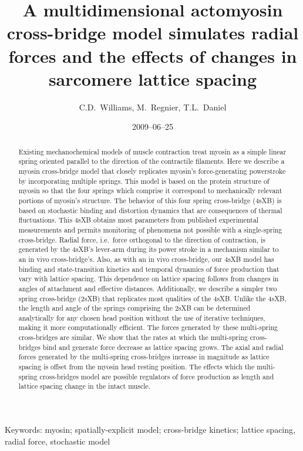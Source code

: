 \documentclass[]{article}
\title{A multidimensional actomyosin cross-bridge model simulates radial forces and the effects of changes in sarcomere lattice spacing}
\author{C.D.\ Williams, M.\ Regnier, T.L.\ Daniel}
\date{2009--06--25}
\begin{document}
\maketitle{}

\begin{abstract} 
Existing mechanochemical models of muscle contraction treat myosin as a simple linear spring oriented parallel to the direction of the contractile filaments.
Here we describe a myosin cross-bridge model that closely replicates myosin's force-generating powerstroke by incorporating multiple springs. 
This model is based on the protein structure of myosin so that the four springs which comprise it correspond to mechanically relevant portions of myosin's structure.
The behavior of this four spring cross-bridge (4sXB) is based on stochastic binding and distortion dynamics that are consequences of thermal fluctuations.  
This 4sXB obtains most parameters from published experimental measurements and permits monitoring of phenomena not possible with a single-spring cross-bridge.
Radial force, i.e.\ force orthogonal to the direction of contraction, is generated by the 4sXB's lever-arm during its power stroke in a mechanism similar to an in vivo cross-bridge's. 
Also, as with an in vivo cross-bridge, our 4sXB model has binding and state-transition kinetics and temporal dynamics of force production that vary with lattice spacing. 
This dependence on lattice spacing follows from changes in angles of attachment and effective distances. 
Additionally, we describe a simpler two spring cross-bridge (2sXB) that replicates most qualities of the 4sXB\@. 
Unlike the 4sXB, the length and angle of the springs comprising the 2sXB can be determined analytically for any chosen head position without the use of iterative techniques,  making it more computationally efficient.
The forces generated by these multi-spring cross-bridges are similar. 
We show that the rates at which the multi-spring cross-bridges bind and generate force decrease as lattice spacing grows. 
The axial and radial forces generated by the multi-spring cross-bridges increase in magnitude as lattice spacing is offset from the myosin head resting position. 
The effects which the multi-spring cross-bridges model are possible regulators of force production as length and lattice spacing change in the intact muscle.
\end{abstract}

Keywords: myosin; spatially-explicit model; cross-bridge kinetics; lattice spacing, radial force, stochastic model
\end{document}
